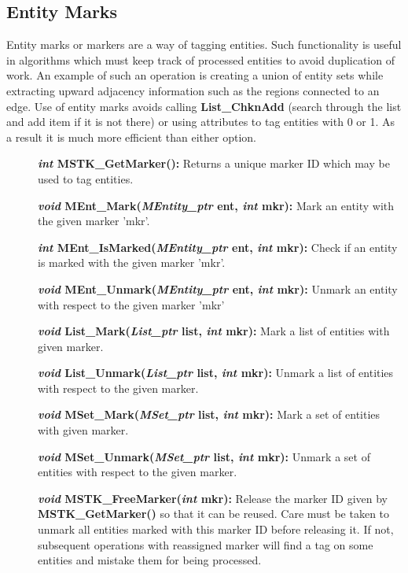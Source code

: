 \documentclass[12pt]{article}
\begin{document}
\newpage
\subsection{Entity Marks}

Entity marks or markers are a way of tagging entities. Such
functionality is useful in algorithms which must keep track of
processed entities to avoid duplication of work. An example of such an
operation is creating a union of entity sets while extracting upward
adjacency information such as the regions connected to an edge. Use of
entity marks avoids calling {\bf List\_ChknAdd} (search through the
list and add item if it is not there) or using attributes to tag
entities with 0 or 1. As a result it is much more efficient than
either option.

\begin{description}
\item[]{\bf {\em int} MSTK\_GetMarker():} Returns a unique marker ID
which may be used to tag entities.

\item[]{\bf {\em void} MEnt\_Mark({\em MEntity\_ptr} ent, {\em int} mkr):} Mark an entity with the given marker 'mkr'.

\item[]{\bf {\em int} MEnt\_IsMarked({\em MEntity\_ptr} ent, {\em int} mkr):} Check if an entity is marked with the given marker 'mkr'.

\item[]{\bf {\em void} MEnt\_Unmark({\em MEntity\_ptr} ent, {\em int} mkr):} Unmark an entity with respect to the given marker 'mkr'

\item[]{\bf {\em void} List\_Mark({\em List\_ptr} list, {\em int} mkr):} Mark a list of entities with given marker.

\item[]{\bf {\em void} List\_Unmark({\em List\_ptr} list, {\em int} mkr):}
Unmark a list of entities with respect to the given marker.

\item[]{\bf {\em void} MSet\_Mark({\em MSet\_ptr} list, {\em int} mkr):} Mark a set of entities with given marker.

\item[]{\bf {\em void} MSet\_Unmark({\em MSet\_ptr} list, {\em int} mkr):}
Unmark a set of entities with respect to the given marker.

\item[]{\bf {\em void} MSTK\_FreeMarker({\em int} mkr):} Release the
marker ID given by {\bf MSTK\_GetMarker()} so that it can be
reused. Care must be taken to unmark all entities marked with this
marker ID before releasing it. If not, subsequent operations with
reassigned marker will find a tag on some entities and mistake them
for being processed.
\end{description}
\end{document}
